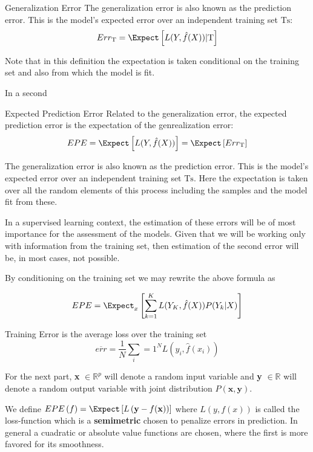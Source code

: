 \begin{definition}{Generalization Error}
	The generalization error is also known as the prediction error. This is the model's expected error over an independent training set $\mathrm{Ts}$:
	$$ Err_{\mathrm{T}} = \Expect \left[ L(Y,\hat{f}(X)) |  \mathrm{T}\right]$$
\end{definition}

Note that in this definition the expectation is taken conditional on the training set and also from which the model is fit.

In a second

\begin{definition}{Expected Prediction Error}
	Related to the generalization error, the expected prediction error is the expectation of the genrealization error:
	$$ EPE = \Expect \left[ L(Y,\hat{f}(X))\right] =  \Expect \left[ Err_{\mathrm{T}}  \right]$$
\end{definition}
The generalization error is also known as the prediction error. This is the model's expected error over an independent training set $\mathrm{Ts}$. Here the expectation is taken over all the random elements of this process including the samples and the model fit from these. 

In a supervised learning context, the estimation of these errors will be of most importance for the assessment of the models.  Given  that we will be working only with information from the training set, then estimation of the second error will be, in most cases, not possible.

By conditioning on the training set we may rewrite the above formula as 

\begin{equation}\label{classificationEPE}
	 EPE = \Expect_x\left[ \sum_{k=1}^{K} L( Y_K , \hat{f}(X) ) P(Y_k|X) \right]
\end{equation}


\begin{definition}{Training Error}
	is the average loss over the training set
	$$ \overline{err} = \frac{1}{N} \sum_i=1^N L(y_i, \hat{f}(x_i) )$$
\end{definition}



For the next part, \textbf{x} $\in \mathbb{R}^{p}$ will denote a random input variable and \textbf{y}  $\in \mathbb{R}$ will denote a random output variable with joint distribution $P\left(\textbf{x},\textbf{y}\right)$.

We define $EPE\left(f \right) = \Expect\left[L\left(\textbf{y} - f(\textbf{x}) \right) \right] $ where $L(y,f\left(x\right))$ is called the loss-function which is a \textbf{semimetric} chosen to penalize errors in prediction. In general a cuadratic or absolute value functions are chosen, where the first is more favored for its smoothness. 

